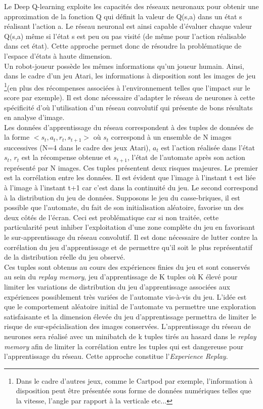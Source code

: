\noindent Le Deep Q-learning\cite{dqn} exploite les capacités des réseaux neuronaux pour obtenir une approximation de la fonction Q qui définit la valeur de Q(s,a) dans un état s réalisant l'action a. Le réseau neuronal est ainsi capable d'évaluer chaque valeur Q(s,a) même si l'état s est peu ou pas visité (de même pour l'action réalisable dans cet état). Cette approche permet donc de résoudre la problématique de l'espace d'états à haute dimension.\\

\noindent Un robot-joueur possède les mêmes informations qu'un joueur humain. Ainsi, dans le cadre d'un jeu Atari, les informations à disposition sont les images de jeu \footnote{Dans le cadre d'autres jeux, comme le Cartpod par exemple, l'information à disposition peut être présentée sous forme de données numériques telles que la vitesse, l'angle par rapport à la verticale etc...}(en plus des récompenses associées à l'environnement telles que l'impact sur le score par exemple). Il est donc nécessaire d'adapter le réseau de neurones à cette spécificité d'où l'utilisation d'un réseau convolutif qui présente de bons résultats en analyse d'image.\\

\noindent Les données d'apprentissage du réseau correspondent à des tuples de données de la forme $<s_t,a_t,r_t,s_{t+1}>$ où $s_t$ correspond à un ensemble de N images successives (N=4 dans le cadre des jeux Atari), $a_t$ est l'action réalisée dans l'état $s_t$, $r_t$ est la récompense obtenue et $s_{t+1}$, l'état de l'automate après son action représenté par N images. Ces tuples présentent deux risques majeures. Le premier est la corrélation entre les données. Il est évident que l'image à l'instant t est liée à l'image à l'instant t+1 car c'est dans la continuité du jeu. Le second correspond à la distribution du jeu de données. Supposons le jeu du casse-briques, il est possible que l'automate, du fait de son initialisation aléatoire, favorise un des deux côtés de l'écran. Ceci est problématique car si non traitée, cette particularité peut inhiber l'exploitation d'une zone complète du jeu en favorisant le sur-apprentissage du réseau convolutif. Il est donc nécessaire de lutter contre la corrélation du jeu d'apprentissage et de permettre qu'il soit le plus représentatif de la distribution réelle du jeu observé.\\

\noindent Ces tuples sont obtenus au cours des expériences finies du jeu et sont conservés au sein du \textit{replay memory}, jeu d'apprentissage de K tuples où K élevé pour limiter les variations de distribution du jeu d'apprentissage associées aux expériences possiblement très variées de l'automate vis-à-vis du jeu. L'idée est que le comportement aléatoire initial de l'automate va permettre une exploration satisfaisante et la dimension élevée du jeu d'apprentissage permettra de limiter le risque de sur-spécialisation des images conservées. L'apprentissage du réseau de neurones sera réalisé avec un minibatch de k tuples tirés au hasard dans le \textit{replay memory} afin de limiter la corrélation entre les tuples qui est dangereuse pour l'apprentissage du réseau. Cette approche constitue l'\textit{Experience Replay}.\\

